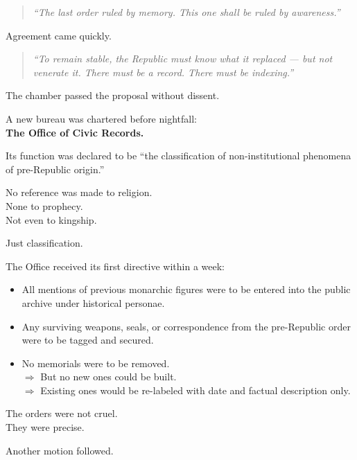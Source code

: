 \documentclass[9pt]{article}
\begin{document}
\begin{quote}
\textit{“The last order ruled by memory. This one shall be ruled by awareness.”}
\end{quote}

Agreement came quickly.

\begin{quote}
\textit{“To remain stable, the Republic must know what it replaced --- but not venerate it. There must be a record. There must be indexing.”}
\end{quote}

The chamber passed the proposal without dissent.

A new bureau was chartered before nightfall:\\
\textbf{The Office of Civic Records.}

Its function was declared to be ``the classification of non-institutional phenomena of pre-Republic origin.''

No reference was made to religion.\\
None to prophecy.\\
Not even to kingship.

Just classification.

\vspace{1em}

The Office received its first directive within a week:

\begin{itemize}
    \item All mentions of previous monarchic figures were to be entered into the public archive under historical personae.
    \item Any surviving weapons, seals, or correspondence from the pre-Republic order were to be tagged and secured.
    \item No memorials were to be removed. \\
        \hspace{1em} $\Rightarrow$ But no new ones could be built. \\
        \hspace{1em} $\Rightarrow$ Existing ones would be re-labeled with date and factual description only.
\end{itemize}

The orders were not cruel.\\
They were precise.

\vspace{1em}

Another motion followed.
\end{document}
